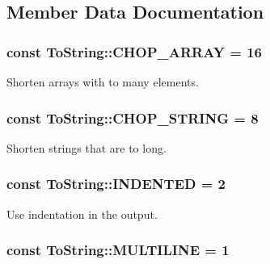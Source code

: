 \subsection{Member Data Documentation}
\hypertarget{class_to_string_aec7fb7dd62edc352ec15d003b790e660}{
\subsubsection[{C\-H\-O\-P\-\_\-\-A\-R\-R\-A\-Y}]{\setlength{\rightskip}{0pt plus 5cm}const To\-String\-::\-C\-H\-O\-P\-\_\-\-A\-R\-R\-A\-Y = 16}}\label{class_to_string_aec7fb7dd62edc352ec15d003b790e660}
Shorten arrays with to many elements. \hypertarget{class_to_string_ad1f58ce47b39958c1f0a9817275f527b}{
\subsubsection[{C\-H\-O\-P\-\_\-\-S\-T\-R\-I\-N\-G}]{\setlength{\rightskip}{0pt plus 5cm}const To\-String\-::\-C\-H\-O\-P\-\_\-\-S\-T\-R\-I\-N\-G = 8}}\label{class_to_string_ad1f58ce47b39958c1f0a9817275f527b}
Shorten strings that are to long. \hypertarget{class_to_string_ae7b63380653281e848f43b1e80453104}{
\subsubsection[{I\-N\-D\-E\-N\-T\-E\-D}]{\setlength{\rightskip}{0pt plus 5cm}const To\-String\-::\-I\-N\-D\-E\-N\-T\-E\-D = 2}}\label{class_to_string_ae7b63380653281e848f43b1e80453104}
Use indentation in the output. \hypertarget{class_to_string_ae96d53863a3dce97aae84f68fa69f77f}{
\subsubsection[{M\-U\-L\-T\-I\-L\-I\-N\-E}]{\setlength{\rightskip}{0pt plus 5cm}const To\-String\-::\-M\-U\-L\-T\-I\-L\-I\-N\-E = 1}}\label{class_to_string_ae96d53863a3dce97aae84f68fa69f77f}
